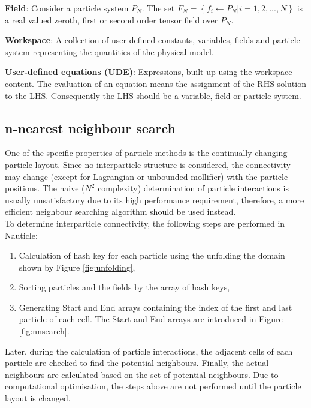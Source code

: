 \documentclass[a4paper,12pt,openany]{book}
\theoremstyle{break}
\begin{document}
\textbf{Field}: Consider a particle system $P_N$. The set $F_N=\left\{f_i\leftarrow P_N \vert i=1,2,...,N\right\}$ is a real valued zeroth, first or second order tensor field over $P_N$.

\textbf{Workspace}: A collection of user-defined constants, variables, fields and particle system representing the quantities of the physical model.

\textbf{User-defined equations (UDE)}: Expressions, built up using the workspace content. The evaluation of an equation means the assignment of the RHS solution to the LHS. Consequently the LHS should be a variable, field or particle system.

\subsection{n-nearest neighbour search} \label{sec:neighbour_search}
One of the specific properties of particle methods is the continually changing particle layout. Since no interparticle structure is considered, the connectivity may change (except for Lagrangian or unbounded mollifier) with the particle positions. The naive ($N^2$ complexity) determination of particle interactions is usually unsatisfactory due to its high performance requirement, therefore, a more efficient neighbour searching algorithm should be used instead. \\
To determine interparticle connectivity, the following steps are performed in Nauticle:
\begin{enumerate}
  \item Calculation of hash key for each particle using the unfolding the domain shown by Figure \ref{fig:unfolding},
  \item Sorting particles and the fields by the array of hash keys,
  \item Generating Start and End arrays containing the index of the first and last particle of each cell. The Start and End arrays are introduced in Figure \ref{fig:nnsearch}.
\end{enumerate}
Later, during the calculation of particle interactions, the adjacent cells of each particle are checked to find the potential neighbours. Finally, the actual neighbours are calculated based on the set of potential neighbours. Due to computational optimisation, the steps above are not performed until the particle layout is changed.
\end{document}
